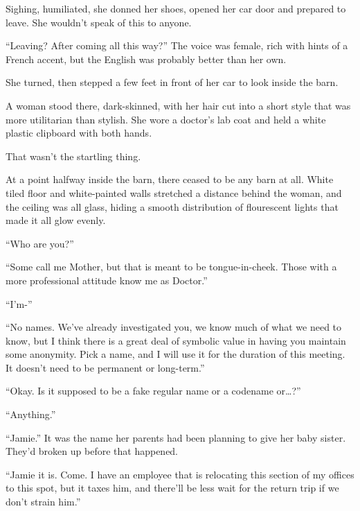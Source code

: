 Sighing, humiliated, she donned her shoes, opened her car door and prepared to leave.  She wouldn't speak of this to anyone.



``Leaving?  After coming all this way?''  The voice was female, rich with hints of a French accent, but the English was probably better than her own.



She turned, then stepped a few feet in front of her car to look inside the barn.



A woman stood there, dark-skinned, with her hair cut into a short style that was more utilitarian than stylish.  She wore a doctor's lab coat and held a white plastic clipboard with both hands.



That wasn't the startling thing.



At a point halfway inside the barn, there ceased to be any barn at all.  White tiled floor and white-painted walls stretched a distance behind the woman, and the ceiling was all glass, hiding a smooth distribution of flourescent lights that made it all glow evenly.



``Who are you?''



``Some call me Mother, but that is meant to be tongue-in-cheek.  Those with a more professional attitude know me as Doctor.''



``I'm-''



``No names.  We've already investigated you, we know much of what we need to know, but I think there is a great deal of symbolic value in having you maintain some anonymity.  Pick a name, and I will use it for the duration of this meeting.  It doesn't need to be permanent or long-term.''



``Okay.  Is it supposed to be a fake regular name or a codename or\ldots?''



``Anything.''



``Jamie.''  It was the name her parents had been planning to give her baby sister.  They'd broken up before that happened.



``Jamie it is.  Come.  I have an employee that is relocating this section of my offices to this spot, but it taxes him, and there'll be less wait for the return trip if we don't strain him.''



